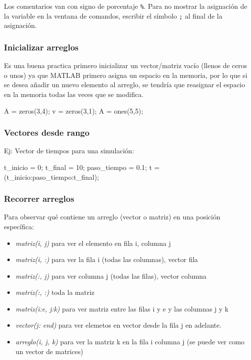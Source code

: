 \noindent Los comentarios van con signo de porcentaje \texttt{\%}. Para no mostrar la asignación de la variable en la ventana de comandos, escribir el símbolo \texttt{;} al final de la asignación.

\subsubsection{Inicializar arreglos}
Es una buena practica primero inicializar un vector/matriz vacío (llenos de ceros o unos) ya que MATLAB primero asigna un espacio en la memoria, por lo que si se desea añadir un nuevo elemento al arreglo, se tendría que reasignar el espacio en la memoria todas las veces que se modifica.

\begin{verbatimg}
    A = zeros(3,4); %
    v = zeros(3,1); %
    A = ones(5,5);  %
\end{verbatimg}

\subsubsection{Vectores desde rango}
Ej: Vector de tiempos para una simulación:
\begin{verbatimg}
    t_inicio = 0; %
    t_final = 10; %
    paso_tiempo = 0.1; %
    t = (t_inicio:paso_tiempo:t_final); %
\end{verbatimg}

\subsubsection{Recorrer arreglos}
\noindent Para observar qué contiene un arreglo (vector o matriz) en una posición específica:

\begin{itemize}
    \item \emph{matriz(i, j)} para ver el elemento en fila i, columna j
    \item \emph{matriz(i, :)}  para ver la fila i (todas las columnas), vector fila
    \item \emph{matriz(:, j)}  para ver columna j (todas las filas), vector columna
    \item \emph{matriz(:, :)}  toda la matriz
    \item \emph{matriz(i:e, j:k)} para ver matriz entre las filas i y e y las columnas j y k
    \item \emph{vector(j: end)} para ver elemetos en vector desde la fila j en adelante.
    \item \emph{arreglo(i, j, k)} para ver la matriz k en la fila i columna j (se puede ver como un vector de matrices)
\end{itemize}

